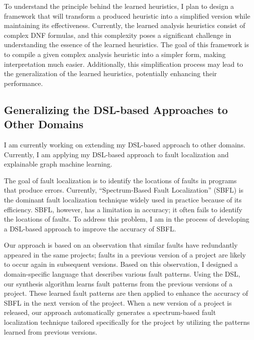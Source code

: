 \documentclass[11pt]{article}
\newcommand{\myparagraph}[1]{\medskip\noindent{\it \textbf{#1.}}}
\begin{document}
To understand the principle behind the learned heuristics, I plan to design a framework that will transform a produced heuristic into a simplified version while maintaining its effectiveness.
%
Currently, the learned analysis heuristics consist of complex DNF formulas, and this complexity poses a significant challenge in understanding the essence of the learned heuristics.
%
The goal of this framework is to compile a given complex analysis heuristic into a simpler form, making interpretation much easier.
%
Additionally, this simplification process may lead to the generalization of the learned heuristics, potentially enhancing their performance.



\subsection{Generalizing the DSL-based Approaches to Other Domains}
I am currently working on extending my DSL-based approach to other domains.
%
Currently, I am applying my DSL-based approach to fault localization and explainable graph machine learning.

\myparagraph{Generalization to Fault Localization}
The goal of fault localization is to identify the locations of faults in programs that produce errors.
%
Currently, ``Spectrum-Based Fault Localization'' (SBFL) is the dominant fault localization technique widely used in practice because of its efficiency.
%
SBFL, however, has a limitation in accuracy; it often fails to identify the locations of faults.
%
To address this problem, I am in the process of developing a DSL-based approach to improve the accuracy of SBFL.


Our approach is based on an observation that similar faults have redundantly appeared in the same projects; faults in a previous version of a project are likely to occur again in subsequent versions.
%
Based on this observation, I designed a domain-specific language that describes various fault patterns.
%
Using the DSL, our synthesis algorithm learns fault patterns from the previous versions of a project.
%
These learned fault patterns are then applied to enhance the accuracy of SBFL in the next version of the project.
%
When a new version of a project is released, our approach automatically generates a spectrum-based fault localization technique tailored specifically for the project by utilizing the patterns learned from previous versions.
\end{document}
